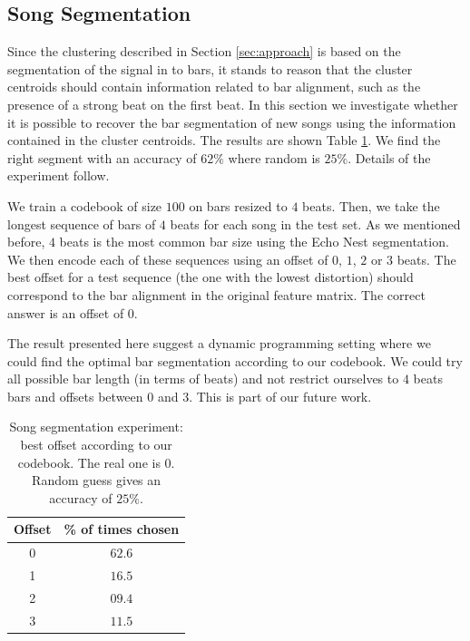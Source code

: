 \documentclass{article}
\begin{document}
\subsection{Song Segmentation} \label{ssec:segment}

Since the clustering described in Section \ref{sec:approach} is based
on the segmentation of the signal in to bars, it stands to reason that
the cluster centroids should contain information related to bar
alignment, such as the presence of a strong beat on the first beat.
%
In this section we investigate whether it is possible to recover the
bar segmentation of new songs using the information contained in the
cluster centroids.  The results are shown Table \ref{tab:offset}. We find
the right segment with an accuracy of $62\%$ where random is
$25\%$. Details of the experiment follow.

We train a codebook of size $100$ on bars resized to $4$ beats. Then,
we take the longest sequence of bars of $4$ beats for each song
in the test set.  As
we mentioned before, $4$ beats is the most common bar size using the
Echo Nest segmentation. We then encode each of these sequences using an offset
of $0$, $1$, $2$ or $3$ beats. The best offset for a test sequence
(the one with the lowest distortion)
should correspond to the bar alignment in the original
feature matrix.  The correct answer is an offset of $0$.


The result presented here suggest a dynamic programming setting where
we could find the optimal bar segmentation according to our codebook. 
We could try
all possible bar length (in terms of beats) and not restrict ourselves
to $4$ beats bars and offsets between $0$ and $3$. This is part of
our future work.

\begin{table}
\begin{center}
\begin{tabular}{cc}
\toprule
Offset & \% of times chosen \\
\midrule
0 & $\mathbf{62.6}$\\
1 & $16.5$\\
2 & $09.4$\\
3 & $11.5$\\
\bottomrule
\end{tabular}
\end{center}
\caption{\small{
Song segmentation experiment:
best offset according to our codebook. The real one is $0$.
Random guess gives an accuracy of $25$\%.
}}
\label{tab:offset}
\end{table}
\end{document}
